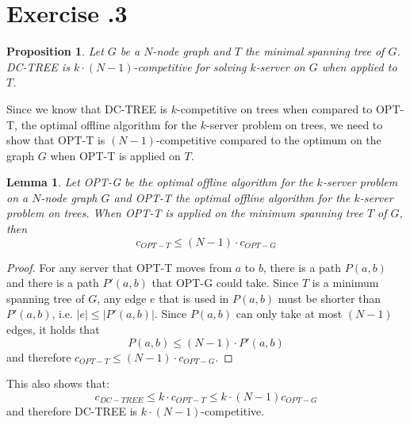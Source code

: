 \documentclass[a4paper,12pt]{scrartcl}
\newcommand{\mal}{\ensuremath{\cdot}}
\newcounter{sheet}
\newcommand{\printsheet}{\arabic{sheet}}
\newtheorem{proposition}{Proposition}[sheet]
\newtheorem{lemma}{Lemma}[sheet]
\begin{document}
\section*{Exercise \printsheet.3}
\begin{proposition}
Let $G$ be a $N$-node graph and $T$ the minimal spanning tree of $G$. DC-TREE is $k\mal (N-1)$-competitive for solving $k$-server on $G$ when applied to $T$.
\end{proposition}
Since we know that DC-TREE is $k$-competitive on trees when compared to OPT-T, the optimal offline algorithm for the $k$-server problem on trees, we need to show that OPT-T is $(N-1)$-competitive compared to the optimum on the graph $G$ when OPT-T is applied on $T$.
\begin{lemma}
Let OPT-G be the optimal offline algorithm for the $k$-server problem on a $N$-node graph $G$ and OPT-T the optimal offline algorithm for the $k$-server problem on trees. When OPT-T is applied on the minimum spanning tree $T$ of $G$, then
\[c_{OPT-T} \leq (N-1)\mal c_{OPT-G}\] 
\end{lemma}
\begin{proof}
For any server that OPT-T moves from $a$ to $b$, there is a path $P(a,b)$ and there is a path $P'(a,b)$ that OPT-G could take. Since $T$ is a minimum spanning tree of $G$, any edge $e$ that is used in $P(a,b)$ must be shorter than $P'(a,b)$, i.e. $|e| \leq |P'(a,b)|$. Since $P(a,b)$ can only take at most $(N-1)$ edges, it holds that 
\[P(a,b) \leq (N-1)\mal P'(a,b)\]
and therefore $c_{OPT-T} \leq (N-1)\mal c_{OPT-G}$. \end{proof}

This also shows that:
\[c_{DC-TREE} \leq k\mal c_{OPT-T} \leq k \mal (N-1) c_{OPT-G}\]
and therefore DC-TREE is $k\mal (N-1)$-competitive.
\end{document}
